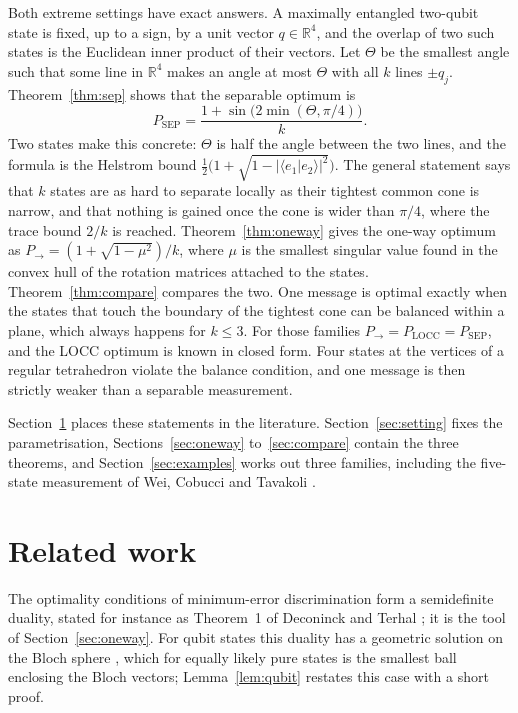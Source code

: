 \documentclass[11pt,a4paper]{article}
\theoremstyle{definition}
\theoremstyle{plain}
\newcommand{\braket}[2]{\langle#1\vert#2\rangle}
\newcommand{\R}{\mathbb{R}}
\newcommand{\Pow}{P_{\to}}
\newcommand{\Psep}{P_{\mathrm{SEP}}}
\newcommand{\Plocc}{P_{\mathrm{LOCC}}}
\begin{document}
Both extreme settings have exact answers. A maximally entangled two-qubit
state is fixed, up to a sign, by a unit vector $q\in\R^4$, and the overlap of
two such states is the Euclidean inner product of their vectors. Let $\Theta$
be the smallest angle such that some line in $\R^4$ makes an angle at most
$\Theta$ with all $k$ lines $\pm q_j$. Theorem~\ref{thm:sep} shows that the
separable optimum is
\[
\Psep=\frac{1+\sin\bigl(2\min(\Theta,\pi/4)\bigr)}{k}.
\]
Two states make this concrete: $\Theta$ is half the angle between the two
lines, and the formula is the Helstrom bound
$\tfrac12\bigl(1+\sqrt{1-\lvert\braket{e_1}{e_2}\rvert^2}\bigr)$. The general
statement says that $k$ states are as hard to separate locally as their
tightest common cone is narrow, and that nothing is gained once the cone is
wider than $\pi/4$, where the trace bound $2/k$ is reached.
Theorem~\ref{thm:oneway} gives the one-way optimum as
$\Pow=(1+\sqrt{1-\mu^2})/k$, where $\mu$ is the smallest singular value found
in the convex hull of the rotation matrices attached to the states.
Theorem~\ref{thm:compare} compares the two. One message is optimal exactly
when the states that touch the boundary of the tightest cone can be balanced
within a plane, which always happens for $k\le3$. For those families
$\Pow=\Plocc=\Psep$, and the LOCC optimum is known in closed form. Four
states at the vertices of a regular tetrahedron violate the balance condition,
and one message is then strictly weaker than a separable measurement.

Section~\ref{sec:related} places these statements in the literature.
Section~\ref{sec:setting} fixes the parametrisation, Sections~\ref{sec:oneway}
to~\ref{sec:compare} contain the three theorems, and
Section~\ref{sec:examples} works out three families, including the five-state
measurement of Wei, Cobucci and Tavakoli \cite{Wei2024}.

\section{Related work}\label{sec:related}
The optimality conditions of minimum-error discrimination form a
semidefinite duality, stated for instance as Theorem~1 of Deconinck and
Terhal \cite{Deconinck2010}; it is the tool of Section~\ref{sec:oneway}. For
qubit states this duality has a geometric solution on the Bloch sphere
\cite{Deconinck2010,Bae2013}, which for equally likely pure states is the
smallest ball enclosing the Bloch vectors; Lemma~\ref{lem:qubit} restates
this case with a short proof.
\end{document}
